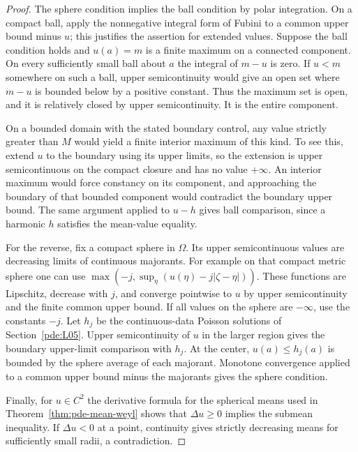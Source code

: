 \documentclass[11pt,oneside,openany]{book}
\theoremstyle{plain}
\theoremstyle{definition}
\theoremstyle{remark}
\begin{document}
\begin{proof}
The sphere condition implies the ball condition by polar
integration. On a compact ball, apply the nonnegative integral
form of Fubini to a common upper bound minus \(u\);
this justifies the assertion for extended values.
Suppose the ball condition holds and \(u(a)=m\) is a finite
maximum on a connected component. On every sufficiently
small ball about \(a\) the integral of \(m-u\) is zero.
If \(u<m\) somewhere on such a ball, upper semicontinuity
would give an open set where \(m-u\) is bounded below by
a positive constant. Thus the maximum set is open, and it is
relatively closed by upper semicontinuity. It is the entire
component.

On a bounded domain with the stated boundary control, any
value strictly greater than \(M\) would yield a finite interior
maximum of this kind. To see this, extend \(u\) to the boundary
using its upper limits, so the extension is upper semicontinuous
on the compact closure and has no value \(+\infty\).
An interior maximum would force constancy on its component,
and approaching the boundary of that bounded component
would contradict the boundary upper bound. The same
argument applied to \(u-h\) gives ball comparison, since
a harmonic \(h\) satisfies the mean-value equality.

For the reverse, fix a compact sphere in \(\Omega\).
Its upper semicontinuous values are decreasing limits of
continuous majorants. For example on that compact metric
sphere one can use
\(\max(-j,\sup_\eta(u(\eta)-j|\zeta-\eta|))\).
These functions are Lipschitz, decrease with \(j\), and
converge pointwise to \(u\) by upper semicontinuity and
the finite common upper bound. If all values on the sphere
are \(-\infty\), use the constants \(-j\).
Let \(h_j\) be the continuous-data Poisson solutions of
Section~\ref{pde:L05}. Upper semicontinuity of \(u\) in the
larger region gives the boundary upper-limit comparison with
\(h_j\). At the center, \(u(a)\le h_j(a)\) is bounded by
the sphere average of each majorant. Monotone convergence
applied to a common upper bound minus the majorants
gives the sphere condition.

Finally, for \(u\in C^2\) the derivative formula for the
spherical means used in Theorem~\ref{thm:pde-mean-weyl}
shows that \(\Delta u\ge0\) implies the submean inequality.
If \(\Delta u<0\) at a point, continuity gives strictly
decreasing means for sufficiently small radii, a contradiction.
\end{proof}
\end{document}
